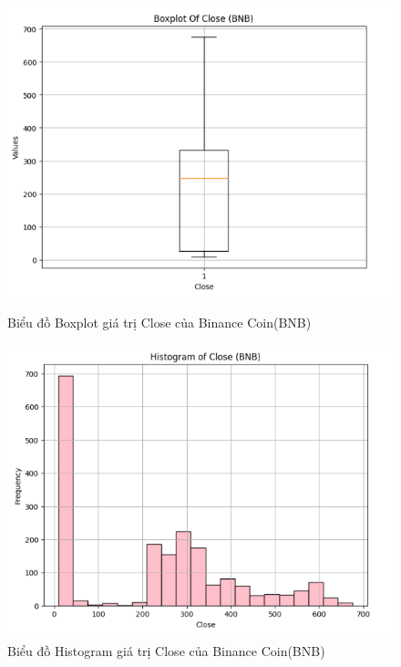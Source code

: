 \documentclass[conference]{IEEEtran}
\begin{document}
	\begin{figure}[H]
		\centering
		\begin{minipage}{0.23\textwidth}
			\centering
			\includegraphics[width=1\textwidth]{Figure/BNBBoxplot.png}
			\caption{Biểu đồ Boxplot giá trị Close của Binance Coin(BNB)}
			\label{fig:1}
		\end{minipage}
		\hfill
		\begin{minipage}{0.23\textwidth}
			\centering
			\includegraphics[width=1\textwidth]{Figure/BNBHistogram.png}
			\caption{Biểu đồ Histogram giá trị Close của Binance Coin(BNB)}
			\label{fig:2}
		\end{minipage}
	\end{figure}
\end{document}
